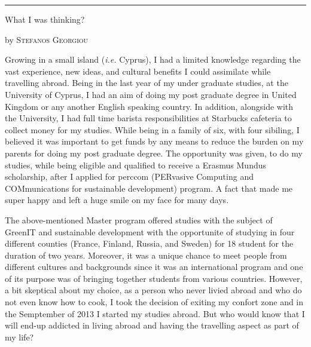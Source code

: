 \documentclass[10pt,a4paper]{article} %
\newcommand{\SepRule}{\noindent	%
\begin{center}
\rule{250pt}{1pt} %
\end{center}
}
\newcommand{\NewsItem}[1]{ %
\usefont{T1}{fvs}{n}{n} %
\vspace{24pt}\large #1\vspace{3pt} %
\par \normalsize \normalfont}
\newcommand{\NewsAuthor}[1]{ %
\hfill by \textsc{#1} \vspace{20pt} %
\par \normalfont}
\begin{document}
\vspace{0.5cm}
\SepRule %
\vspace{0.5cm}

\begin{multicols}{3} %


\NewsItem{What I was thinking?}
\NewsAuthor{Stefanos Georgiou}

Growing in a small island (\textit{i.e.} Cyprus), I had a limited knowledge regarding 
the vast experience, new ideas, and cultural benefits I could assimilate while 
travelling abroad. 
Being in the last year of my under graduate studies, at the University of Cyprus, 
I had an aim of doing my post graduate degree in United Kingdom or any another 
English speaking country. 
In addition, alongside with the University, I had full time barista responsibilities 
at Starbucks cafeteria to collect money for my studies. 
While being in a family of six, with four sibiling, I believed it was important 
to get funds by any means to reduce the burden on my parents for doing my post graduate 
degree. 
The opportunity was given, to do my studies, while being eligible and qualified to 
receive a Erasmus Mundus scholarship, after I applied for {\sc perccom} (PERvasive 
Computing and COMmunications for sustainable development) program. 
A fact that made me super happy and left a huge smile on my face for many days.


The above-mentioned Master program offered studies with the subject of GreenIT and 
sustainable development with the opportunite of studying in four different counties 
(France, Finland, Russia, and Sweden) for 18 student for the duration of two years. 
Moreover, it was a unique chance to meet people from different cultures and backgrounds 
since it was an international program and one of its purpose was of bringing together 
students from various countries. 
However, a bit skeptical about my choice, as a person who never livied abroad and 
who do not even know how to cook, I took the decision of exiting my confort zone 
and in the Semptember of 2013 I started my studies abroad. 
But who would know that I will end-up addicted in living abroad and having the 
travelling aspect as part of my life?



\end{multicols}
\end{document}
